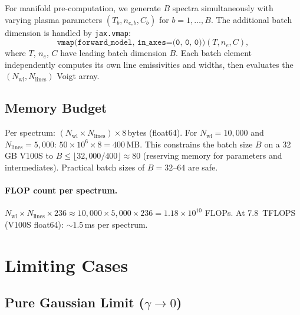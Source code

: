 \documentclass[11pt]{article}
\begin{document}
For manifold pre-computation, we generate $B$ spectra simultaneously with
varying plasma parameters $(T_b, n_{e,b}, C_b)$ for $b = 1, \ldots, B$.
The additional batch dimension is handled by \texttt{jax.vmap}:
\begin{equation}
  \texttt{vmap(forward\_model, in\_axes=(0, 0, 0))}(T, n_e, C),
  \label{eq:vmap_batch}
\end{equation}
where $T$, $n_e$, $C$ have leading batch dimension $B$.
Each batch element independently computes its own line emissivities and widths,
then evaluates the $(N_{\text{wl}}, N_{\text{lines}})$ Voigt array.

\subsection{Memory Budget}

Per spectrum: $(N_{\text{wl}} \times N_{\text{lines}}) \times 8$\,bytes (float64).
For $N_{\text{wl}} = 10{,}000$ and $N_{\text{lines}} = 5{,}000$:
$50 \times 10^6 \times 8 = 400$\,MB. This constrains the batch size $B$ on a
32\,GB V100S to $B \leq \lfloor 32{,}000 / 400 \rfloor \approx 80$
(reserving memory for parameters and intermediates). Practical batch sizes of
$B = 32$--$64$ are safe.

\paragraph{FLOP count per spectrum.}
$N_{\text{wl}} \times N_{\text{lines}} \times 236 \approx 10{,}000 \times 5{,}000 \times 236
= 1.18 \times 10^{10}$ FLOPs. At 7.8~TFLOPS (V100S float64): $\sim 1.5$\,ms per spectrum.


\section{Limiting Cases}
\label{sec:limits}


\subsection{Pure Gaussian Limit ($\gamma \to 0$)}
\end{document}
